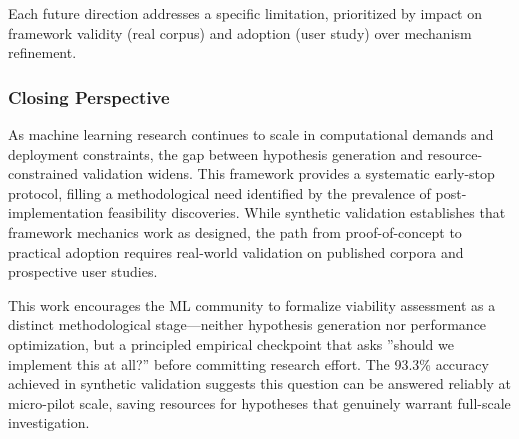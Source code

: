 Each future direction addresses a specific limitation, prioritized by impact on framework validity (real corpus) and adoption (user study) over mechanism refinement.

\subsubsection{Closing Perspective}

As machine learning research continues to scale in computational demands and deployment constraints, the gap between hypothesis generation and resource-constrained validation widens. This framework provides a systematic early-stop protocol, filling a methodological need identified by the prevalence of post-implementation feasibility discoveries. While synthetic validation establishes that framework mechanics work as designed, the path from proof-of-concept to practical adoption requires real-world validation on published corpora and prospective user studies.

This work encourages the ML community to formalize viability assessment as a distinct methodological stage---neither hypothesis generation nor performance optimization, but a principled empirical checkpoint that asks ''should we implement this at all?'' before committing research effort. The 93.3\% accuracy achieved in synthetic validation suggests this question can be answered reliably at micro-pilot scale, saving resources for hypotheses that genuinely warrant full-scale investigation.
